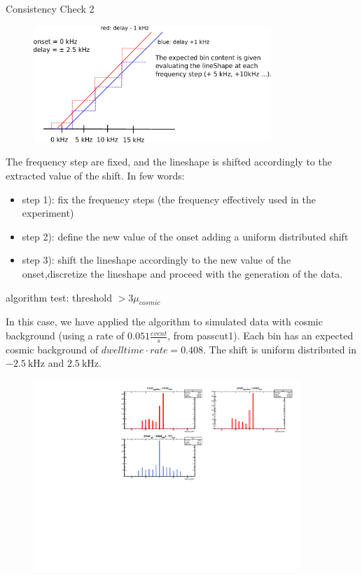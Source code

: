 \documentclass[8pt]{beamer}
\begin{document}
\begin{frame}{Consistency Check 2}


\begin{figure}
\includegraphics[width = 0.8\textwidth]{ExplainingAlgorithm2.pdf}
\end{figure}

The frequency step are fixed, and the lineshape is shifted accordingly to the extracted value of the shift. In few words:
\begin{itemize}
\item step 1): fix the frequency steps (the frequency effectively used in the experiment)
\item step 2): define the new value of the onset adding a uniform distributed shift  
\item step 3): shift the lineshape accordingly to the new value of the onset,\newline discretize the lineshape and proceed with the generation of the data.
\end{itemize}
\end{frame}

\begin{frame}{algorithm test: threshold $ > 3 \mu_{cosmic}$}

In this case, we have applied the algorithm to simulated data with cosmic background (using a rate of $0.051 \frac{event}{s}$, from passcut1). Each bin has an expected cosmic background of $dwelltime \cdot rate = 0.408$.
The shift is uniform distributed in $\SI{-2.5}{\kilo \hertz}$ and $\SI{+2.5}{\kilo \hertz}$. 
\begin{figure}
\includegraphics[width = 0.9\textwidth]{../Plot/OnsetResult11.pdf}
\end{figure}
\end{frame}
\end{document}
